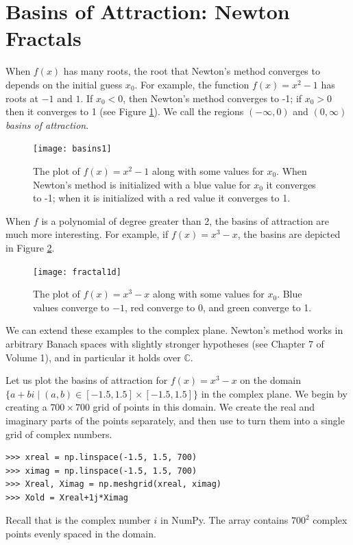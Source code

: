 \section*{Basins of Attraction: Newton Fractals}
When $f(x)$ has many roots, the root that Newton's method converges to depends on the initial guess $x_0$.
For example, the function $f(x)=x^2-1$ has roots at $-1$ and $1$.
If $x_0<0$, then Newton's method converges to -1; if $x_0>0$ then it converges to 1 (see Figure \ref{fig:basins1}).
We call the regions $(-\infty, 0)$ and $(0, \infty)$ \emph{basins of attraction}.

\begin{figure}
\begin{center}
\texttt{[image: basins1]}
\caption{The plot of $f(x) = x^2 -1$ along with some values for $x_0$.
When Newton's method is initialized with a blue value for $x_0$ it converges to -1; when it is initialized with a red value it converges to 1.}
\label{fig:basins1}
\end{center}
\end{figure}

When $f$ is a polynomial of degree greater than 2, the basins of attraction are much more interesting.
For example, if $f(x) = x^3-x$, the basins are depicted in Figure \ref{fig:fractal_1d}.

\begin{figure}
\begin{center}
\texttt{[image: fractal1d]}
\caption{The plot of $f(x) = x^3 -x$ along with some values for $x_0$.
Blue values converge to $-1$, red converge to 0, and green converge to 1.}
\label{fig:fractal_1d}
\end{center}
\end{figure}

We can extend these examples to the complex plane. 
Newton's method works in arbitrary Banach spaces with slightly stronger hypotheses (see Chapter 7 of Volume 1), and in particular it holds over $\mathbb{C}$.

Let us plot the basins of attraction for $f(x) = x^3-x$ on the domain $\{a+bi \mid (a, b) \in [-1.5, 1.5] \times [-1.5, 1.5] \}$ in the complex plane.
We begin by creating a $700 \times 700$ grid of points in this domain. 
We create the real and imaginary parts of the points separately, and then use  to turn them into a single grid of complex numbers.
\begin{lstlisting}
>>> xreal = np.linspace(-1.5, 1.5, 700)
>>> ximag = np.linspace(-1.5, 1.5, 700)
>>> Xreal, Ximag = np.meshgrid(xreal, ximag)
>>> Xold = Xreal+1j*Ximag
\end{lstlisting}
Recall that  is the complex number $i$ in NumPy. 
The array  contains $700^2$ complex points evenly spaced in the domain.

